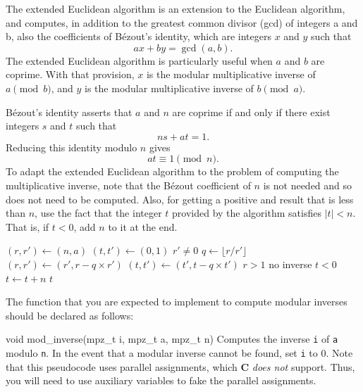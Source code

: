 The extended Euclidean algorithm is an extension to the Euclidean
algorithm, and computes, in addition to the greatest common divisor
(gcd) of integers a and b, also the coefficients of B\'ezout's identity,
which are integers $x$ and $y$ such that
\[
  a x + b y = \gcd(a, b) .
\]
The extended Euclidean algorithm is particularly useful when $a$ and $b$
are coprime. With that provision, $x$ is the modular multiplicative
inverse of $a \pmod{b}$, and $y$ is the modular multiplicative inverse
of $b \pmod{a}$.

B\'ezout's identity asserts that $a$ and $n$ are coprime if and only if
there exist integers $s$ and $t$ such that
\[
  n s + a t = 1.
\]
Reducing this identity modulo $n$ gives
\[
  a t \equiv 1 \pmod{n}.
\]
To adapt the extended Euclidean algorithm to the problem of computing
the multiplicative inverse, note that the B\'ezout coefficient of $n$ is
not needed and so does not need to be computed. Also, for getting a
positive and result that is less than $n$,  use the fact that the
integer $t$ provided by the algorithm satisfies $| t | < n$. That is, if
$t < 0$, add $n$ to it at the end.

\begin{codebox}
  \li $(r, r') \gets (n, a)$
  \li $(t, t') \gets (0, 1)$
  \li \While $r' \ne 0$
  \li \Then $q \gets \lfloor r / r' \rfloor$
  \li       $(r, r') \gets (r', r - q \times r')$
  \li       $(t, t') \gets (t', t - q \times t')$
      \End
  \li \If $r > 1$ \li \Then \Return no inverse \End
  \li \If $t < 0$ \li \Then $t \gets t + n$ \End
  \li \Return $t$
\end{codebox}

The function that you are expected to implement to compute modular
inverses should be declared as follows:

\begin{funcdoc}{void mod\_inverse(mpz\_t i, mpz\_t a, mpz\_t n)}
  Computes the inverse \texttt{i} of \texttt{a} modulo \texttt{n}. In
  the event that a modular inverse cannot be found, set \texttt{i} to 0.
  Note that this pseudocode uses parallel assignments, which \textbf{C}
  \emph{does not} support. Thus, you will need to use auxiliary
  variables to fake the parallel assignments.
\end{funcdoc}
